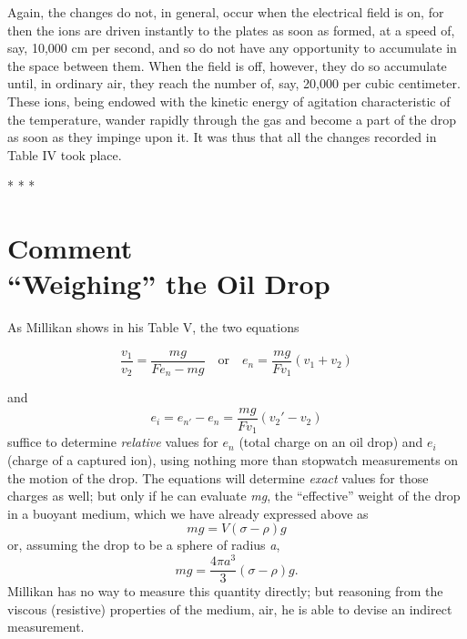 Again, the changes do not, in general, occur when the electrical field
is on, for then the ions are driven instantly to the plates as soon as
formed, at a speed of, say, 10,000 cm per second, and so do not have
any opportunity to accumulate in the space between them. When the field
is off, however, they do so accumulate until, in ordinary air, they
reach the number of, say, 20,000 per cubic centimeter. These ions, being
endowed with the kinetic energy of agitation characteristic of the
temperature, wander rapidly through the gas and become a part of the
drop as soon as they impinge upon it. It was thus that all the changes
recorded in Table IV took place.\\
\centerline{* * *}
%
\section*{Comment \\
  {\large``Weighing'' the Oil Drop}}

As Millikan shows in his Table V, the two equations
%
\begin{center}
\begin{equation*}\tag{9}
\frac{v_1}{v_2} = \frac{mg}{Fe_n-mg} \quad \text{or} \quad e_n = \frac{mg}{Fv_1}(v_1+v_2)
\end{equation*}
\end{center}
%
and
%
\begin{equation}\tag{10}
e_i = e_{n'}-e_n=\frac{mg}{Fv_1}(v_{2}'-v_2)
\end{equation}
%
suffice to determine \emph{relative} values for $e_n$ (total charge
on an oil drop) and $e_i$ (charge of a captured ion), using nothing
more than stopwatch measurements on the motion of the drop. The
equations will determine \emph{exact} values for those charges as well;
but only if he can evaluate \emph{mg}, the ``effective'' weight of the
drop in a buoyant medium, which we have already expressed above as
%
\begin{equation*}
mg = V(\sigma\!-\!\rho)g
\end{equation*}
%
or, assuming the drop to be a sphere of radius \emph{a},
%
\begin{equation*}\tag{3.6}
mg = \frac{4\pi{a}^3}{3}(\sigma\!-\!\rho)g. \label{eq:millikan_3.6}
\end{equation*}
%
Millikan has no way to measure this quantity directly; but reasoning
from the viscous (resistive) properties of the medium, air, he is able
to devise an indirect measurement.

